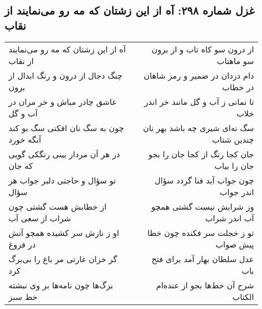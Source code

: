 \begin{center}
\section*{غزل شماره ۲۹۸: آه از این زشتان که مه رو می‌نمایند از نقاب}
\label{sec:0298}
\begin{longtable}{l p{0.5cm} r}
آه از این زشتان که مه رو می‌نمایند از نقاب
&&
از درون سو کاه تاب و از برون سو ماهتاب
\\
چنگ دجال از درون و رنگ ابدال از برون
&&
دام دزدان در ضمیر و رمز شاهان در خطاب
\\
عاشق چادر مباش و خر مران در آب و گل
&&
تا نمانی ز آب و گل مانند خر اندر خلاب
\\
چون به سگ نان افکنی سگ بو کند آنگه خورد
&&
سگ نه‌ای شیری چه باشد بهر نان چندین شتاب
\\
در هر آن مردار بینی رنگکی گویی که جان
&&
جان کجا رنگ از کجا جان را بجو جان را بیاب
\\
تو سؤال و حاجتی دلبر جواب هر سؤال
&&
چون جواب آید فنا گردد سؤال اندر جواب
\\
از خطابش هست گشتی چون شراب از سعی آب
&&
وز شرابش نیست گشتی همچو آب اندر شراب
\\
او ز نازش سر کشیده همچو آتش در فروغ
&&
تو ز خجلت سر فکنده چون خطا پیش صواب
\\
گر خزان غارتی مر باغ را بی‌برگ کرد
&&
عدل سلطان بهار آمد برای فتح باب
\\
برگ‌ها چون نامه‌ها بر وی نبشته خط سبز
&&
شرح آن خط‌ها بجو از عنده‌ام الکتاب
\\
\end{longtable}
\end{center}
